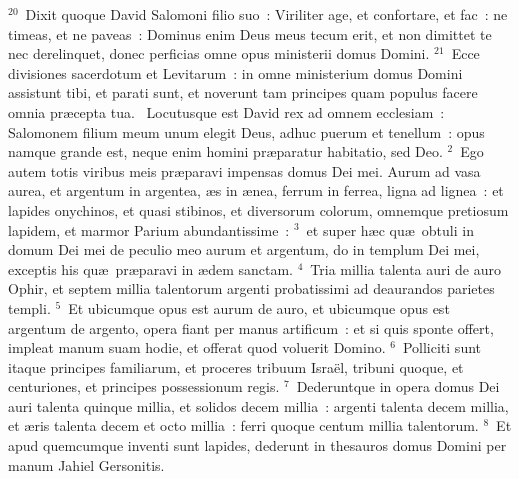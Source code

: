 ${}^{20}$~Dixit quoque David Salomoni filio suo~: Viriliter age, et confortare, et fac~: ne timeas, et ne paveas~: Dominus enim Deus meus tecum erit, et non dimittet te nec derelinquet, donec perficias omne opus ministerii domus Domini.
${}^{21}$~Ecce divisiones sacerdotum et Levitarum~: in omne ministerium domus Domini assistunt tibi, et parati sunt, et noverunt tam principes quam populus facere omnia pr\ae cepta tua.
~Locutusque est David rex ad omnem ecclesiam~: Salomonem filium meum unum elegit Deus, adhuc puerum et tenellum~: opus namque grande est, neque enim homini pr\ae paratur habitatio, sed Deo.
${}^{2}$~Ego autem totis viribus meis pr\ae paravi impensas domus Dei mei. Aurum ad vasa aurea, et argentum in argentea, \ae s in \ae nea, ferrum in ferrea, ligna ad lignea~: et lapides onychinos, et quasi stibinos, et diversorum colorum, omnemque pretiosum lapidem, et marmor Parium abundantissime~:
${}^{3}$~et super h\ae c qu\ae\ obtuli in domum Dei mei de peculio meo aurum et argentum, do in templum Dei mei, exceptis his qu\ae\ pr\ae paravi in \ae dem sanctam.
${}^{4}$~Tria millia talenta auri de auro Ophir, et septem millia talentorum argenti probatissimi ad deaurandos parietes templi.
${}^{5}$~Et ubicumque opus est aurum de auro, et ubicumque opus est argentum de argento, opera fiant per manus artificum~: et si quis sponte offert, impleat manum suam hodie, et offerat quod voluerit Domino.
${}^{6}$~Polliciti sunt itaque principes familiarum, et proceres tribuum Isra\"el, tribuni quoque, et centuriones, et principes possessionum regis.
${}^{7}$~Dederuntque in opera domus Dei auri talenta quinque millia, et solidos decem millia~: argenti talenta decem millia, et \ae ris talenta decem et octo millia~: ferri quoque centum millia talentorum.
${}^{8}$~Et apud quemcumque inventi sunt lapides, dederunt in thesauros domus Domini per manum Jahiel Gersonitis.



